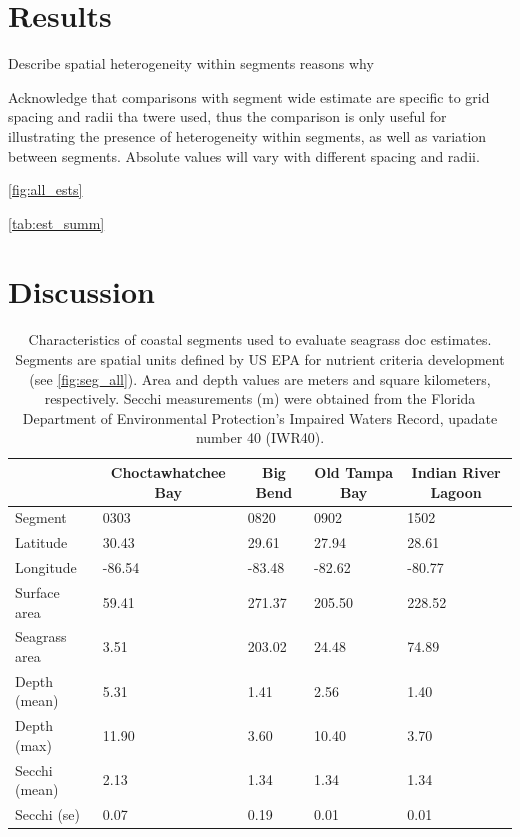 \documentclass[letterpaper,12pt,oneside]{article}\usepackage[]{graphicx}\usepackage[]{color}
\begin{document}
\section{Results}

Describe spatial heterogeneity within segments reasons why

Acknowledge that comparisons with segment wide estimate are specific to grid spacing and radii tha twere used, thus the comparison is only useful for illustrating the presence of heterogeneity within segments, as well as variation between segments.  Absolute values will vary with different spacing and radii. 

\cref{fig:all_ests}

\cref{tab:est_summ}

\section{Discussion}



\clearpage
\begin{singlespace}


\end{singlespace}
\clearpage


\begin{table}[!tbp]
\caption{Characteristics of coastal segments used to evaluate seagrass \acl{doc} estimates.  Segments are spatial units defined by US \ac{EPA} for nutrient criteria development (see \cref{fig:seg_all}).  Area and depth values are meters and square kilometers, respectively.  Secchi measurements (m) were obtained from the Florida Department of Environmental Protection's Impaired Waters Record, upadate number 40 (IWR40).\label{tab:seg_summ}} 
\begin{center}
\begin{tabular}{lllll}
\hline\hline
\multicolumn{1}{l}{}&\multicolumn{1}{c}{Choctawhatchee Bay}&\multicolumn{1}{c}{Big Bend}&\multicolumn{1}{c}{Old Tampa Bay}&\multicolumn{1}{c}{Indian River Lagoon}\tabularnewline
\hline
Segment&0303&0820&0902&1502\tabularnewline
Latitude& 30.43& 29.61& 27.94& 28.61\tabularnewline
Longitude&-86.54&-83.48&-82.62&-80.77\tabularnewline
Surface area& 59.41&271.37&205.50&228.52\tabularnewline
Seagrass area&  3.51&203.02& 24.48& 74.89\tabularnewline
Depth (mean)&  5.31&  1.41&  2.56&  1.40\tabularnewline
Depth (max)& 11.90&  3.60& 10.40&  3.70\tabularnewline
Secchi (mean)&  2.13&  1.34&  1.34&  1.34\tabularnewline
Secchi (se)&  0.07&  0.19&  0.01&  0.01\tabularnewline
\hline
\end{tabular}\end{center}

\end{table}
\end{document}
